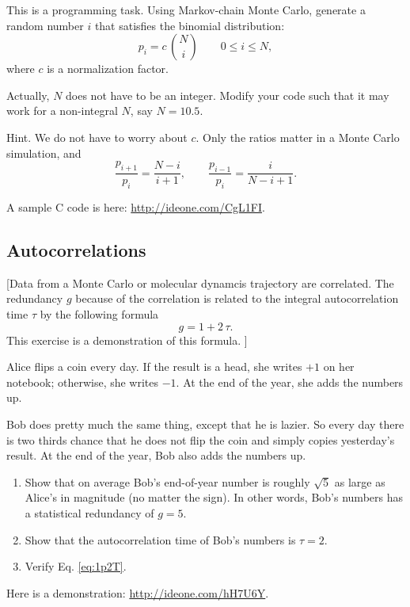 \documentclass[12pt]{article}
\begin{document}
This is a programming task.
%
Using Markov-chain Monte Carlo,
generate a random number $i$ that satisfies the binomial distribution:
$$
p_i = c \, {N \choose i}
\qquad
0 \le i \le N
,
$$
where $c$ is a normalization factor.

Actually, $N$ does not have to be an integer.
Modify your code such that it may work for a non-integral $N$,
say $N = 10.5$.

Hint. We do not have to worry about $c$.
Only the ratios matter in a Monte Carlo simulation, and
$$
\frac{ p_{i+1} } { p_i } = \frac{ N - i } { i + 1 },
\qquad
\frac{ p_{i-1} } { p_i } = \frac{ i } { N - i + 1}.
$$

A sample C code is here: \url{http://ideone.com/CgL1FI}.



\subsection{Autocorrelations}

[Data from a Monte Carlo or molecular dynamcis trajectory are correlated.
  The redundancy $g$ because of the correlation
  is related to the integral autocorrelation time $\tau$
  by the following formula
  \begin{equation}
    g = 1 + 2 \, \tau.
  \label{eq:1p2T}
  \end{equation}
  This exercise is a demonstration of this formula.
]

Alice flips a coin every day.
%
If the result is a head, she writes $+1$ on her notebook;
otherwise, she writes $-1$.
%
At the end of the year, she adds the numbers up.

Bob does pretty much the same thing, except that he is lazier.
%
So every day there is two thirds chance that he does not flip the coin
and simply copies yesterday's result.
%
At the end of the year, Bob also adds the numbers up.

\begin{enumerate}
  \item
  Show that on average Bob's end-of-year number
  is roughly $\sqrt 5$ as large as Alice's
  in magnitude (no matter the sign).
  In other words, Bob's numbers has
  a statistical redundancy of $g = 5$.

  \item
  Show that the autocorrelation time of Bob's numbers
  is $\tau = 2$.

  \item
  Verify Eq. \eqref{eq:1p2T}.
\end{enumerate}

Here is a demonstration:
\url{http://ideone.com/hH7U6Y}.
\end{document}
